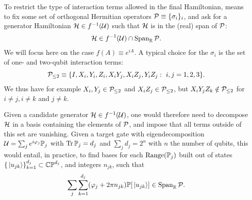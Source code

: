 To restrict the type of interaction terms allowed in the final Hamiltonian, means to fix some set of orthogonal Hermitian operators ${\mathcal{P}}\equiv\{\sigma_i\}_i$, and ask for a generator Hamiltonian ${\mathcal{H}}\in f^{-1}({\mathcal{U}})$ such that ${\mathcal{H}}$ is in the (real) span of ${\mathcal{P}}$:
\begin{equation}
    {\mathcal{H}} \in f^{-1}({\mathcal{U}}) \cap \operatorname{Span}_{\mathbb{R}}{\mathcal{P}}.
\end{equation}
We will focus here on the case  $f(A)\equiv e^{iA}$.
A typical choice for the $\sigma_i$ is the set of one- and two-qubit interaction terms:
\begin{equation}
    {\mathcal{P}}_{\le2} \equiv \{ I, X_i,Y_i,Z_i, X_i Y_j, X_i Z_j, Y_i Z_j : \,\,i,j=1,2,3 \}.
\end{equation}
We thus have for example $X_i,Y_j\in{\mathcal{P}}_{\le2}$ and $X_i Z_j\in{\mathcal{P}}_{\le2}$, but $X_i Y_j Z_k\notin{\mathcal{P}}_{\le2}$ for $i\neq j,i\neq k$ and $j\neq k$.

Given a candidate generator ${\mathcal{H}}\in f^{-1}({\mathcal{U}})$, one would therefore need to decompose ${\mathcal{H}}$ in a basis containing the elements of ${\mathcal{P}}$, and impose that all terms outside of this set are vanishing.
Given a target gate with eigendecomposition
${\mathcal{U}}=\sum_j e^{i\varphi_j}{\mathbb{P}}_j$ with $\Tr\PP_j=d_j$ and $\sum_j d_j=2^n$ with $n$ the number of qubits, this would entail, in practice, to find bases for each $\operatorname{Range}({\mathbb{P}}_j)$ built out of states $\{\ket*{u_{jk}}\}_{k=1}^{d_j}\subset \mathbb{CP}^{d_j}$, and integers $n_{jk}$, such that
\begin{equation}
    \sum_j\sum_{k=1}^{d_j} (\varphi_j + 2\pi n_{jk}) {\mathbb{P}}[\ket*{u_{jk}}]
    \in \operatorname{Span}_{{\mathbb{R}}}{\mathcal{P}}.
\end{equation}

